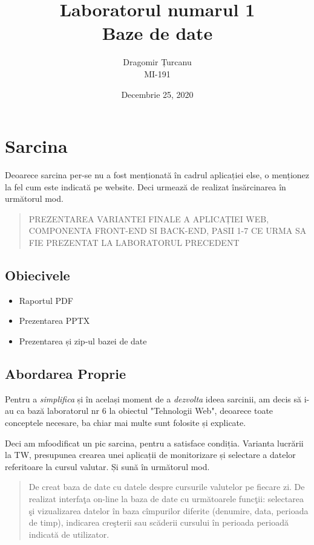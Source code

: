 \documentclass[12pt. a4paper]{report}
\title{%
	Laboratorul numarul 1 \\
	\large Baze de date}
\author{%
	Dragomir Țurcanu \\
	\large MI-191}
\date{Decembrie 25, 2020}
\begin{document}
\maketitle
\tableofcontents

\chapter{Sarcina}


Deoarece sarcina per-se nu a fost menționată în cadrul aplicației else, o menționez la fel cum este indicată pe website. Deci urmează de realizat însărcinarea în următorul mod.

\begin{quote}
PREZENTAREA VARIANTEI FINALE A APLICAȚIEI WEB, COMPONENTA FRONT-END SI BACK-END, PASII 1-7 CE URMA SA FIE PREZENTAT LA LABORATORUL PRECEDENT
\end{quote}

\section{Obiecivele}

\begin{itemize}
	\item Raportul PDF
	\item Prezentarea PPTX
	\item Prezentarea și zip-ul bazei de date
\end{itemize}

\section{Abordarea Proprie}
Pentru a \emph{simplifica} și în același moment de a \emph{dezvolta} ideea sarcinii, am decis să i-au ca bază laboratorul nr 6 la obiectul "Tehnologii Web", deoarece toate conceptele necesare, ba chiar mai multe sunt folosite și explicate.

Deci am mfoodificat un pic sarcina, pentru a satisface condiția. Varianta lucrării la TW, presupunea crearea unei aplicații de monitorizare și selectare a datelor referitoare la cursul valutar. Și sună în următorul mod.

\begin{quote}
De creat baza de date cu datele despre cursurile valutelor pe fiecare zi. De realizat interfaţa on-line la baza
de date cu următoarele funcţii: selectarea şi vizualizarea datelor în baza cîmpurilor diferite (denumire, data,
perioada de timp), indicarea creşterii sau scăderii cursului în perioada perioadă indicată de utilizator.
\end{quote}
\end{document}
